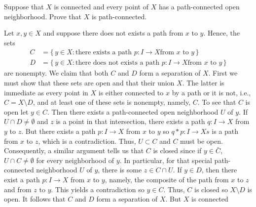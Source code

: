 \begin{problem}
  Suppose that \(X\) is connected and every point of \(X\) has a
  path-connected open neighborhood. Prove that \(X\) is path-connected.
\end{problem}
\begin{solution}
  Let \(x,y\in X\) and suppose there does not exists a path from \(x\) to
  \(y\). Hence, the sets
  \begin{align*}
    C&=\bigl\{\,y\in X:\text{there exists a path \(p\colon I\to X\)
       from \(x\) to \(y\)}\,\bigr\}\\
    D&=\bigl\{\,y\in X:\text{there does not exists a path \(p\colon I\to X\)
       from \(x\) to \(y\)}\,\bigr\}
  \end{align*}
  are nonempty. We claim that both \(C\) and \(D\) form a separation of
  \(X\). First we must show that these sets are open and that their union
  \(X\). The latter is immediate as every point in \(X\) is either
  connected to \(x\) by a path or it is not, i.e., \(C=X\setminus D\), and
  at least one of these sets is nonempty, namely, \(C\). To see that \(C\)
  is open let \(y\in C\). Then there exists a path-connected open
  neighborhood \(U\) of \(y\). If \(U\cap D\neq\emptyset\) and \(z\) is a
  point in that intersection, there exists a path \(q\colon I\to X\) from
  \(y\) to \(z\). But there exists a path \(p\colon I\to X\) from \(x\) to
  \(y\) so \(q*p\colon I\to Xs\) is a path from \(x\) to \(z\), which is a
  contradiction. Thus, \(U\subset C\) and \(C\) must be open. Consequently,
  a similar argument tells us that \(C\) is closed since if \(y\in\bar C\),
  \(U\cap C\neq\emptyset\) for every neighborhood of \(y\). In particular,
  for that special path-connected neighborhood \(U\) of \(y\), there is
  some \(z\in C\cap U\). If \(y\in D\), then there exist a path
  \(p\colon I\to X\) from \(x\) to \(y\), namely, the composite of the path
  from \(x\) to \(z\) and from \(z\) to \(y\). This yields a contradiction
  so \(y\in C\). Thus, \(C\) is closed so \(X\setminus D\) is open. It
  follows that \(C\) and \(D\) form a separation of \(X\). But \(X\) is
  connected
\end{solution}

